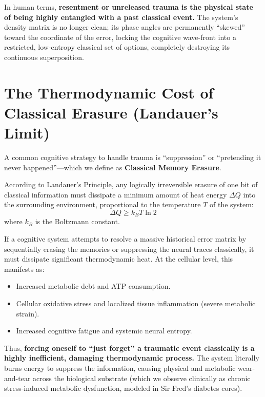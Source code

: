 \documentclass[11pt,twocolumn]{article}
\begin{document}
In human terms, \textbf{resentment or unreleased trauma is the physical state of being highly entangled with a past classical event.} The system's density matrix is no longer clean; its phase angles are permanently ``skewed'' toward the coordinate of the error, locking the cognitive wave-front into a restricted, low-entropy classical set of options, completely destroying its continuous superposition.

\section{The Thermodynamic Cost of \\ Classical Erasure (Landauer's Limit)}

A common cognitive strategy to handle trauma is ``suppression'' or ``pretending it never happened''---which we define as \textbf{Classical Memory Erasure}. 

According to Landauer's Principle, any logically irreversible erasure of one bit of classical information must dissipate a minimum amount of heat energy $\Delta Q$ into the surrounding environment, proportional to the temperature $T$ of the system:
\begin{equation}
\Delta Q \geq k_B T \ln 2
\end{equation}
where $k_B$ is the Boltzmann constant.

If a cognitive system attempts to resolve a massive historical error matrix by sequentially erasing the memories or suppressing the neural traces classically, it must dissipate significant thermodynamic heat. At the cellular level, this manifests as:
\begin{itemize}
    \item Increased metabolic debt and ATP consumption.
    \item Cellular oxidative stress and localized tissue inflammation (severe metabolic strain).
    \item Increased cognitive fatigue and systemic neural entropy.
\end{itemize}

Thus, \textbf{forcing oneself to ``just forget'' a traumatic event classically is a highly inefficient, damaging thermodynamic process.} The system literally burns energy to suppress the information, causing physical and metabolic wear-and-tear across the biological substrate (which we observe clinically as chronic stress-induced metabolic dysfunction, modeled in Sir Fred's diabetes cores).
\end{document}
